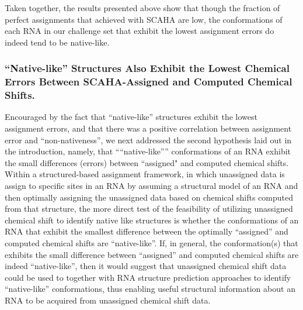 \documentclass[journal=jcisd8,manuscript=article,layout=onecolumn]{achemso}
\begin{document}
Taken together, the results presented above show that though the fraction of perfect assignments that achieved with SCAHA are low, the conformations of each RNA in our challenge set that exhibit the lowest assignment errors do indeed tend to be native-like.

\subsubsection{``Native-like'' Structures Also Exhibit the Lowest Chemical Errors Between SCAHA-Assigned and Computed Chemical Shifts.} Encouraged by the fact that ``native-like'' structures exhibit the lowest assignment errors, and that there was a positive correlation between assignment error and ``non-nativeness'', we next addressed the second hypothesis laid out in the introduction, namely, that “``native-like''” conformations of an RNA exhibit the small differences (errors) between ``assigned" and computed chemical shifts. Within a structured-based assignment framework, in which unassigned data is assign to specific sites in an RNA by assuming a structural model of an RNA and then optimally assigning the unassigned data based on chemical shifts computed from that structure, the more direct test of the feasibility of utilizing unassigned chemical shift to identify native like structures is whether the conformations of an RNA that exhibit the smallest difference between the optimally ``assigned'' and computed chemical shifts are ``native-like''. If, in general, the conformation(s) that exhibits the small difference between ``assigned'' and computed chemical shifts are indeed ``native-like'', then it would suggest that unassigned chemical shift data could be used to together with RNA structure prediction approaches to identify ``native-like'' conformations, thus enabling useful structural information about an RNA to be acquired from unassigned chemical shift data.
\end{document}
